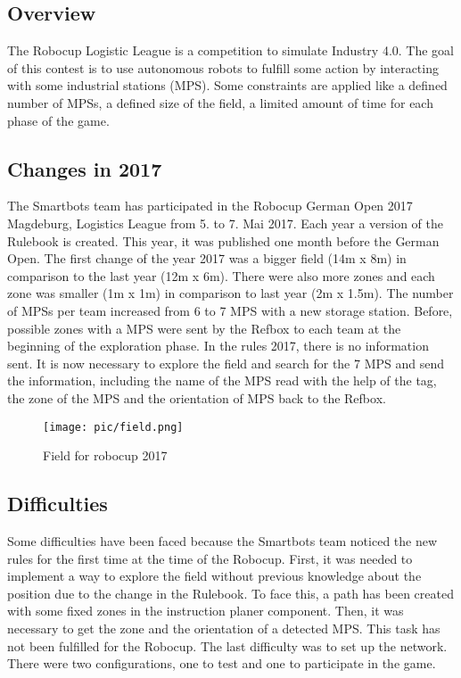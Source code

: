 \subsection{Overview}

The Robocup Logistic League is a competition to simulate Industry 4.0.  The goal of this contest is to use autonomous robots to fulfill some action by interacting with some industrial stations (MPS). Some constraints are applied like a defined number of MPSs, a defined size of the field, a limited amount of time for each phase of the game. 

\subsection{Changes in 2017}

The Smartbots team has participated in the Robocup German Open 2017 Magdeburg, Logistics League from 5. to 7. Mai 2017. Each year a version of the Rulebook is created. This year, it was published one month before the German Open. The first change of the year 2017 was a bigger field (14m x 8m) in comparison to the last year (12m x 6m). There were also more zones and each zone was smaller (1m x 1m) in comparison to last year (2m x 1.5m). The number of MPSs per team increased from 6 to 7 MPS with a new storage station. Before, possible zones with a MPS were sent by the Refbox to each team at the beginning of the exploration phase. In the rules 2017, there is no information sent. It is now necessary to explore the field and search for the 7 MPS and send the information, including the name of the MPS read with the help of the tag, the zone of the MPS and the orientation of MPS back to the Refbox. 

\begin{figure}%
\centering
\texttt{[image: pic/field.png]}
\caption{Field for robocup 2017}
\label{fig:frog}
\end{figure}

\subsection{Difficulties}

Some difficulties have been faced because the Smartbots team noticed the new rules for the first time at the time of the Robocup. First, it was needed to implement a way to explore the field without previous knowledge about the position due to the change in the Rulebook. To face this, a path has been created with some fixed zones in the instruction planer component. Then, it was necessary to get the zone and the orientation of a detected MPS. This task has not been fulfilled for the Robocup. The last difficulty was to set up the network. There were two configurations, one to test and one to participate in the game.
 

